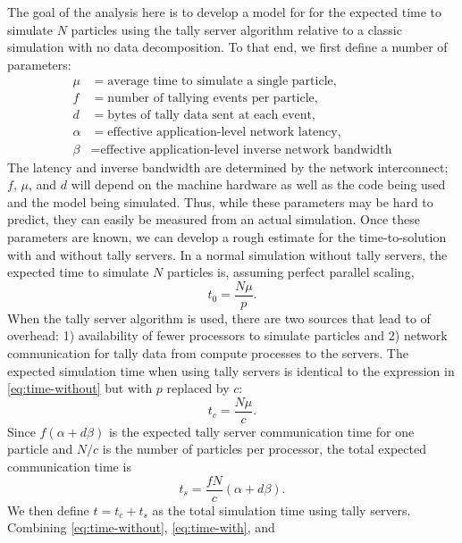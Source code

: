 \documentclass{snamc2013}
\begin{document}
The goal of the analysis here is to develop a model for for the expected time to
simulate $N$ particles using the tally server algorithm relative to a classic
simulation with no data decomposition. To that end, we first define a number of
parameters:
\begin{align*}
  \mu &= \text{average time to simulate a single particle}, \\
  f &= \text{number of tallying events per particle}, \\
  d &= \text{bytes of tally data sent at each event}, \\
  \alpha &= \text{effective application-level network latency}, \\
  \beta &= \text{effective application-level inverse network bandwidth}
\end{align*}
The latency and inverse bandwidth are determined by the network interconnect;
$f$, $\mu$, and $d$ will depend on the machine hardware as well as the code
being used and the model being simulated. Thus, while these parameters may be
hard to predict, they can easily be measured from an actual simulation. Once
these parameters are known, we can develop a rough estimate for the
time-to-solution with and without tally servers. In a normal simulation without
tally servers, the expected time to simulate $N$ particles is, assuming perfect
parallel scaling,
\begin{equation}
  \label{eq:time-without}
  t_0 = \frac{N\mu}{p}.
\end{equation}
When the tally server algorithm is used, there are two sources that lead to of
overhead: 1) availability of fewer processors to simulate particles and 2)
network communication for tally data from compute processes to the servers. The
expected simulation time when using tally servers is identical to the expression
in \autoref{eq:time-without} but with $p$ replaced by $c$:
\begin{equation}
  \label{eq:time-with}
  t_c = \frac{N\mu}{c}.
\end{equation}
Since $f(\alpha + d \beta)$ is the expected tally server communication time for
one particle and $N/c$ is the number of particles per processor, the total
expected communication time is
\begin{equation}
  \label{eq:time-send}
  t_s = \frac{fN}{c} \left ( \alpha + d\beta \right ).
\end{equation}
We then define $t = t_c + t_s$ as the total simulation time using tally
servers. Combining \autoref{eq:time-without}, \autoref{eq:time-with}, and
\end{document}
